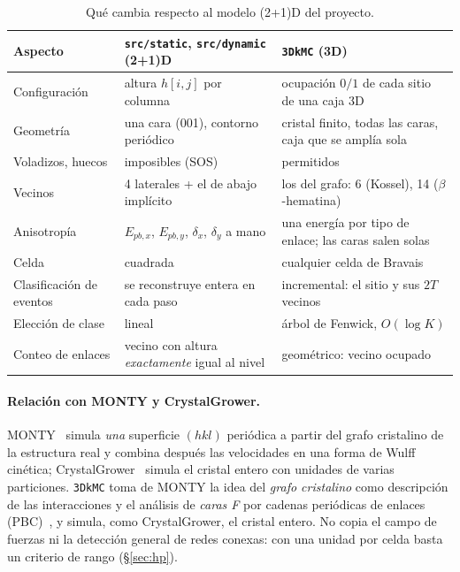 \documentclass[11pt,a4paper]{article}
\newcommand{\code}[1]{\texttt{#1}}
\newcommand{\bh}{$\beta$-hematina}
\begin{document}
\begin{table}[t]
\centering\small
\caption{Qué cambia respecto al modelo (2+1)D del proyecto.}
\label{tab:2dvs3d}
\begin{tabularx}{\linewidth}{@{}>{\raggedright\arraybackslash}p{3.1cm}YY@{}}
\toprule
Aspecto & \code{src/static}, \code{src/dynamic} (2+1)D & \code{3DkMC} (3D)\\
\midrule
Configuración & altura $h[i,j]$ por columna & ocupación $0/1$ de cada sitio de una caja 3D\\
Geometría & una cara (001), contorno periódico & cristal finito, todas las caras, caja que se amplía sola\\
Voladizos, huecos & imposibles (SOS) & permitidos\\
Vecinos & 4 laterales + el de abajo implícito & los del grafo: 6 (Kossel), 14 (\bh{})\\
Anisotropía & $E_{pb,x}$, $E_{pb,y}$, $\delta_x$, $\delta_y$ a mano & una energía por tipo de enlace; las caras salen solas\\
Celda & cuadrada & cualquier celda de Bravais\\
Clasificación de eventos & se reconstruye entera en cada paso & incremental: el sitio y sus $2T$ vecinos\\
Elección de clase & lineal & árbol de Fenwick, $O(\log K)$\\
Conteo de enlaces & vecino con altura \emph{exactamente} igual al nivel & geométrico: vecino ocupado\\
\bottomrule
\end{tabularx}
\end{table}

\paragraph{Relación con MONTY y CrystalGrower.} MONTY~\cite{boerrigter2004} simula \emph{una}
superficie $(hkl)$ periódica a partir del grafo cristalino de la estructura real y combina después
las velocidades en una forma de Wulff cinética; CrystalGrower~\cite{anderson2017} simula el cristal
entero con unidades de varias particiones. \code{3DkMC} toma de MONTY la idea del \emph{grafo
cristalino} como descripción de las interacciones y el análisis de \emph{caras F} por cadenas
periódicas de enlaces (PBC)~\cite{hartman1955}, y simula, como CrystalGrower, el cristal entero.
No copia el campo de fuerzas ni la detección general de redes conexas: con una unidad por celda
basta un criterio de rango (\S\ref{sec:hp}).
\end{document}
